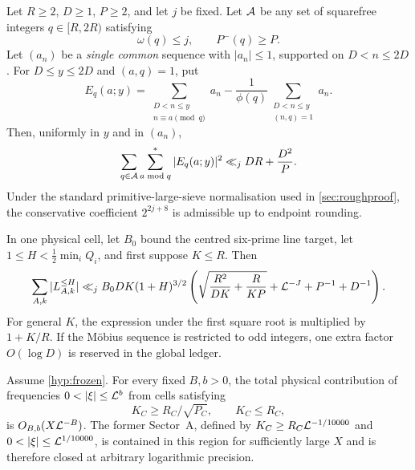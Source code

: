 \begin{theorem}\label{thm:roughvariance-main}
Let $R\ge2$, $D\ge1$, $P\ge2$, and let $j$ be fixed.  Let $\mathcal A$ be any set of
squarefree integers $q\in[R,2R)$ satisfying
\[
       \omega(q)\le j,\qquad P^-(q)\ge P.
\]
Let $(a_n)$ be a \emph{single common} sequence with $|a_n|\le1$, supported on
$D<n\le2D$.  For $D\le y\le2D$ and $(a,q)=1$, put
\[
 E_q(a;y)=
 \sum_{\substack{D<n\le y\\n\equiv a\pmod q}}a_n
 -\frac1{\phi(q)}\sum_{\substack{D<n\le y\\(n,q)=1}}a_n.
\]
Then, uniformly in $y$ and in $(a_n)$,
\begin{equation}\label{eq:roughvariance-main}
 \sum_{q\in\mathcal A}\sum_{a\bmod q}^{*}|E_q(a;y)|^2
       \ll_j DR+\frac{D^2}{P}.
\end{equation}
Under the standard primitive-large-sieve normalisation used in
\cref{sec:roughproof}, the conservative coefficient $2^{2j+8}$ is admissible
up to endpoint rounding.
\end{theorem}

\begin{theorem}\label{thm:transference-main}
In one physical cell, let $B_0$ bound the centred six-prime line target, let
$1\le H<\frac12\min_iQ_i$, and first suppose $K\le R$.  Then
\begin{equation}\label{eq:transference-main}
 \sum_{A,k}|L_{A,k}^{\le H}|
 \ll_j B_0DK(1+H)^{3/2}
 \left(
   \sqrt{\frac{R^2}{DK}+\frac{R}{KP}}
   +\mathcal L^{-J}+P^{-1}+D^{-1}
 \right).
\end{equation}
For general $K$, the expression under the first square root is multiplied by
$1+K/R$.  If the M\"obius sequence is restricted to odd integers, one extra
factor $O(\log D)$ is reserved in the global ledger.
\end{theorem}

\begin{corollary}\label{cor:sectorA}
Assume \cref{hyp:frozen}.  For every fixed $B,b>0$, the total physical
contribution of frequencies $0<|\xi|\le\LL^b$ from cells satisfying
\[
        K_C\ge R_C/\sqrt{P_C},\qquad K_C\le R_C,
\]
is $O_{B,b}(X\mathcal L^{-B})$.  The former Sector~A, defined by
$K_C\ge R_C\mathcal L^{-1/10000}$ and $0<|\xi|\le\LL^{1/10000}$, is contained in
this region for sufficiently large $X$ and is therefore closed at arbitrary
logarithmic precision.
\end{corollary}

